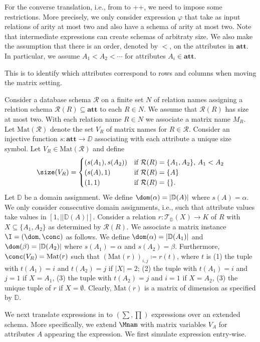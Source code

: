 For the converse translation, i.e., from \ARA to \lang++, we need to impose some restrictions. More precisely, we only consider \ARA expression $\varphi$
that take as input relations of arity at most two and also have a schema of arity at most two. Note that intermediate expressions can create schemas of arbitraty size. We also make the assumption that there is an order, denoted by $<$, on the attributes in $\mathbf{att}$. In particular, we assume $A_1<A_2<\cdots$ for attributes $A_i\in\mathbf{att}$.

This is to identify which attributes correspond to rows and columns when moving the matrix setting. 


Consider a database schema $\mathcal{R}$ on a finite set $N$ of relation names
 assigning a relation schema $\mathcal{R}(R)\subseteq\mathbf{att}$ to each $R \in N$. We assume that $\mathcal{R}(R)$ has size at most two. With each relation name $R\in N$ we associate a matrix name $M_R$. Let $\text{Mat}(\mathcal{R})$ denote the set
 $V_R$ of matrix names for $R\in\mathcal{R}$. Consider an injective function $s:\mathbf{att}\to \DD$ associating with each attribute a unique size symbol. Let $V_R\in \text{Mat}(\mathcal{R})$ and
define
 $$
\size(V_R)=\begin{cases}
(s(A_1),s(A_2)) & \text{if $\mathcal{R}(R)=\{A_1,A_2\}$, $A_1<A_2$}\\
(s(A),1) & \text{if $\mathcal{R}(R)=\{A\}$}\\
(1,1) & \text{if $\mathcal{R}(R)=\{\}$}.
\end{cases}
 $$
Let $\mathbb{D}$ be a domain assignment. We define 
$\dom(\alpha)=|\mathbb{D}(A)|$ where $s(A)=\alpha$.
We only consider consecutive domain assignments, i.e.,
such that attribute values take values in $[1,||\mathbb{D}(A)|]$.
Consider 
a relation $r:
\mathcal{T}_{\mathbb{D}}(X) \to K$ of $R$ with $X\subseteq\{A_1,A_2\}$  as determined by
$\mathcal{R}(R)$. We associate a matrix instance $\I = (\dom,\conc)$ as follows.
We define $\dom(\alpha)=|\mathbb{D}(A_1)|$ and
$\dom(\beta)=|\mathbb{D}(A_2)|$ where $s(A_1)=\alpha$ and $s(A_2)=\beta$. Furthermore,
$\conc(V_R)=\text{Mat}(r)$ such that 
$(\text{Mat}(r))_{i,j} \coloneqq  r(t)$, where $t$ is (1) the tuple with $t(A_1) = i$ and $t(A_2) = j$ if $|X| = 2$; (2) the tuple with $t(A_1) = i$ and $j = 1$ if $X = {A_1}$,
(3) the tuple with $t(A_2) = j$ and $i = 1$ if $X = {A_2}$,
(3) the unique tuple of $r$ if $X=\emptyset$. Clearly, $\text{Mat}(r)$ is a matrix of dimension as
specified by $\mathbb{D}$. 


%
%
We next translate \ARA expressions in to \lang$(\sum,\prod)$ expressions over an extended schema. More specifically, we extend 
$\Mnam$ with matrix variables $V_A$ for attributes $A$ appearing the \ARA expression. We first simulate \ARA expression entry-wise.

